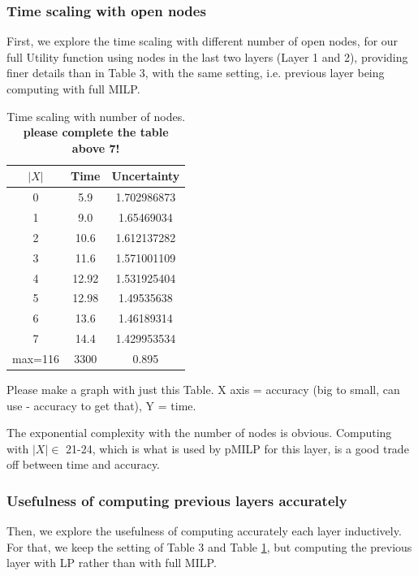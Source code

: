 \subsubsection*{Time scaling with open nodes}	

First, we explore the time scaling with different number of open nodes, for our full Utility function using nodes in the last two layers (Layer 1 and 2), providing finer details than in Table 3, with the same setting, i.e. previous layer being computing with full MILP.

\begin{table}[h!]
	\centering
	\begin{tabular}{|c|c|c|}
		\hline
		$|X|$ & Time & Uncertainty\\ 
		\hline	0 & 5.9 & 1.702986873\\
		\hline	1 & 9.0 & 1.65469034\\
		\hline	2 & 10.6 & 1.612137282\\
		\hline	3 & 11.6 & 1.571001109\\
		\hline	4 & 12.92 & 1.531925404\\
		\hline	5 & 12.98 & 1.49535638\\
		\hline	6 & 13.6 & 1.46189314\\
		\hline	7 & 14.4 & 1.429953534\\
		\hline max=116 & 3300 & 0.895\\ 
		\hline
		
	\end{tabular}
	\caption{Time scaling with number of nodes. {\bf please complete the table above 7!}}
	\label{table14}
\end{table}


Please make a graph with just this Table. 
X axis = accuracy (big to small, can use - accuracy to get that), Y = time.

The exponential complexity with the number of nodes is obvious. 
Computing with $|X| \in$ 21-24, which is what is used by pMILP for this layer, is a good trade off between time and accuracy.

\subsubsection*{Usefulness of computing previous layers accurately}	

Then, we explore the usefulness of computing accurately each layer inductively.
For that, we keep the setting of Table 3 and Table \ref{table14}, but computing the previous layer with LP rather than with full MILP.


